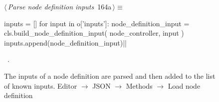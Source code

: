 \documentclass[%
    a4paper,    %
    justified,  %
    nobib,      %
    openany     %
]{tufte-book}
\makeatletter
\renewcommand{\label}[1]{\@tufte@label{##1}}%
\makeatother
\begin{document}
\begin{figure}[!htbp]
\begin{flushleft} \small
\begin{minipage}{\linewidth}\label{scrap126}\raggedright\small
{} $\langle\,${\itshape Parse node definition inputs}\nobreak\ {\footnotesize {164a}}$\,\rangle\equiv$
\vspace{-1ex}
\begin{pythoncode}
inputs = []
for input in o['inputs']:
    node_definition_input = cls.build_node_definition_input(
        node_controller, input
    )
    inputs.append(node_definition_input)|\NWsep|
\end{pythoncode}
\vspace{1.5ex}
\footnotesize
\begin{list}{}{\setlength{\itemsep}{-\parsep}\setlength{\itemindent}{-\leftmargin}}
\item \NWtxtMacroRefIn\ .

\item{}
\end{list}
\end{minipage}\vspace{4ex}
\end{flushleft}
\caption{The inputs of a node definition are parsed and then added to
the list of known inputs.
  \newline{}\newline{}Editor $\rightarrow$ JSON $\rightarrow$
  Methods $\rightarrow$ Load node definition}
\end{figure}
\end{document}
